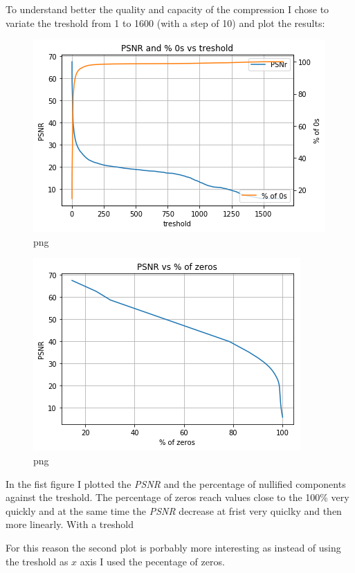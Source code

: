 \documentclass{letter}
\newcommand{\tmem}[1]{{\em #1\/}}
\begin{document}
To understand better the quality and capacity of the compression I chose to
variate the treshold from 1 to 1600 (with a step of 10) and plot the results:

\begin{figure}[h]
  \begin{center}
    \includegraphics{output_18_0.png} 
  \end{center}
  \caption{png}
\end{figure}

\begin{figure}[h]
  \begin{center}
    \includegraphics{output_18_1.png} 
  \end{center}
  \caption{png}
\end{figure}

In the fist figure I plotted the {\tmem{PSNR}} and the percentage of nullified
components against the treshold. The percentage of zeros reach values close to
the 100\% very quickly and at the same time the {\tmem{PSNR}} decrease at
frist very quiclky and then more linearly. With a treshold

For this reason the second plot is porbably more interesting as instead of
using the treshold as $x$ axis I used the pecentage of zeros.
\end{document}
